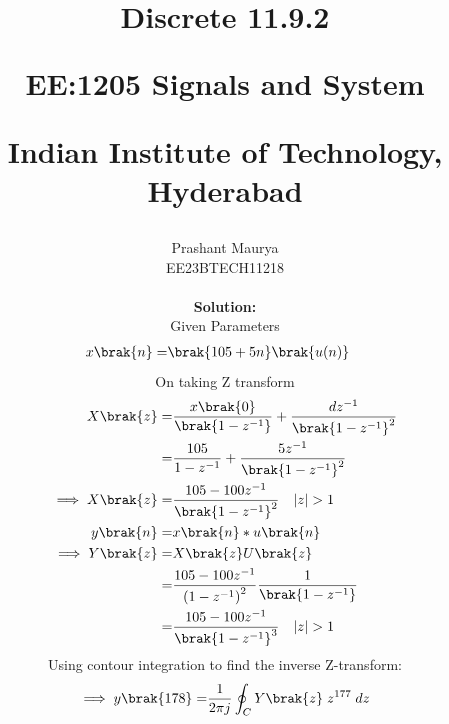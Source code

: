 \documentclass[journal,12pt,twocolumn]{IEEEtran}
\theoremstyle{remark}
\begin{document}
%




\vspace{3cm}

\title{
Discrete 11.9.2 

\large{EE:1205 Signals and System}

Indian Institute of Technology, Hyderabad
}
\author{Prashant Maurya

EE23BTECH11218
\maketitle

\newpage


\bigskip

\renewcommand{\thefigure}{\arabic{figure}}
\renewcommand{\thetable}{\arabic{table}}
\\
\bigskip
\textbf{Solution:}
\fi
\begin{table}[!h]
	\centering
	
	\vspace{6 pt}
	\caption{Given Parameters}
\end{table}
\begin{align}
	x\brak{n}= & \brak{105+5n}\brak{u(n)}
\end{align}
On taking Z transform
\begin{align}
X\brak{z}= &\frac {x\brak{0}} {\brak{1-z^{-1}}} + \frac {dz^{-1}} {\brak{1-z^{-1}}^2} \\
= &\dfrac{105}{1-z^{-1}} + \frac{5z^{-1}}{\brak{1-z^{-1}}^{2}}\\
\implies X\brak{z}=& \dfrac{105-100z^{-1}}{{\brak{1-z^{-1}}}^2} \quad |z|>1\\
y\brak{n}=& x\brak{n}* u\brak{n}\\
\implies Y\brak{z}=& X\brak{z}U\brak{z}\\
=& \dfrac{105-100z^{-1}}{{(1-z^{-1})}^2}\frac1 {\brak{1-z^{-1}}} \\
=& \dfrac{105-100z^{-1}}{\brak{1-z^{-1}}^{3}} \quad |z|>1
\end{align}
Using contour integration to find the inverse Z-transform:\\
\begin{align}
    \implies y\brak{178}=&\dfrac{1}{2\pi j}\oint_{C}Y\brak{z} \;z^{177} \;dz\\

\end{align}}
\end{document}
